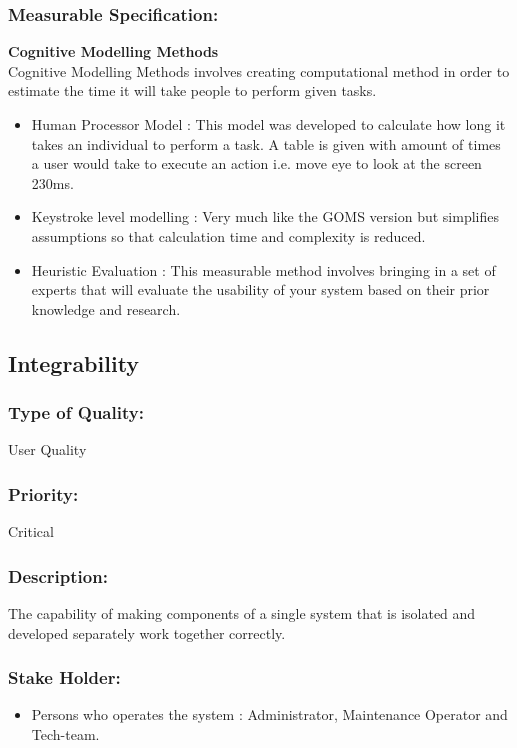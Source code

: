 \documentclass[11pt]{article}
\begin{document}
		\subsubsection{Measurable Specification:}
			\textbf{Cognitive Modelling Methods}\\
				Cognitive Modelling Methods involves creating computational method in order to estimate the time it will take people to perform given tasks.
			\begin{itemize}			
			
				\item Human Processor Model : This model was developed to calculate how long it takes an individual to perform a task. A table is given with amount of times a user would take to execute an action i.e. move eye to look at the screen 230ms.
				\item Keystroke level modelling : Very much like the GOMS version but simplifies assumptions so that calculation time and complexity is reduced.
				\item  Heuristic Evaluation	 : This measurable method involves bringing in a set of experts that will evaluate the usability of your system based on their prior knowledge and research. 
			
			\end{itemize}
		
	\subsection{Integrability}
		
		\subsubsection{Type of Quality:}
			\textbf{} User Quality
		
		\subsubsection{Priority:}
		\textbf{} Critical
		
		\subsubsection{Description:}
			\textbf{}The capability of making components of a single system that is isolated and developed separately work together correctly.
		
		\subsubsection{Stake Holder:}
			\begin{itemize}
				\item Persons who operates the system : Administrator, Maintenance Operator and Tech-team.
			\end{itemize}
\end{document}
